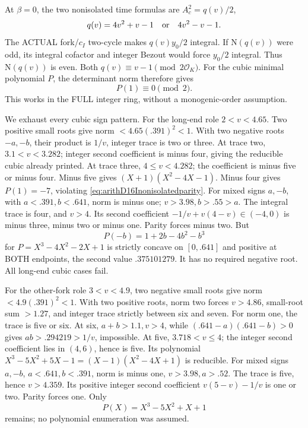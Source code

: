 \documentclass[11pt]{article}
\begin{document}
At \(\beta=0\), the two nonisolated
time formulas are \(A_c^2=q(v)/2\),
\[
                     q(v)=4v^2+v-1\quad\hbox{or}\quad4v^2-v-1 .
\]
The ACTUAL fork/\(c_I\) two-cycle
makes \(q(v)y_0/2\) integral.
If \(\mathrm N(q(v))\) were odd,
its integral cofactor and integer
Bezout would force \(y_0/2\) integral.
Thus \(\mathrm N(q(v))\) is even.
Both \(q(v)\equiv v-1\pmod{2\mathcal O_K}\).
For the cubic minimal polynomial \(P\),
the determinant norm therefore gives
\[
                                      P(1)\equiv0\pmod2 .
\tag{D16Iparity}\label{eq:arithD16Inonisolatedparity}
\]
This works in the FULL integer ring,
without a monogenic-order assumption.

We exhaust every cubic sign pattern.
For the long-end role \(2<v<4.65\).
Two positive small roots give norm
\(<4.65(.391)^2<1\).
With two negative roots \(-a,-b\),
their product is \(1/v\), integer trace
is two or three.
At trace two, \(3.1<v<3.282\);
integer second coefficient is minus four,
giving the reducible cubic already printed.
At trace three, \(4\le v<4.282\);
the coefficient is minus five or minus
four.
Minus five gives
\((X+1)(X^2-4X-1)\).
Minus four gives \(P(1)=-7\), violating
\eqref{eq:arithD16Inonisolatedparity}.
For mixed signs \(a,-b\), with
\(a<.391,b<.641\), norm is minus one;
\(v>3.98,b>.55>a\).
The integral trace is four, and
\(v>4\).
Its second coefficient
\(-1/v+v(4-v)\in(-4,0)\)
is minus three, minus two or minus one.
Parity forces minus two.
But
\[
 P(-b)=1+2b-4b^2-b^3
\]
for \(P=X^3-4X^2-2X+1\) is strictly
concave on \([0,.641]\) and positive
at BOTH endpoints, the second value
\(.375101279\).
It has no required negative root.
All long-end cubic cases fail.

For the other-fork role \(3<v<4.9\),
two negative small roots give norm
\(<4.9(.391)^2<1\).
With two positive roots, norm two
forces \(v>4.86\), small-root sum
\(>1.27\), and integer trace strictly
between six and seven.
For norm one, the trace is five or six.
At six, \(a+b>1.1,v>4\), while
\((.641-a)(.641-b)>0\) gives
\(ab>.294219>1/v\), impossible.
At five, \(3.718<v\le4\);
the integer second coefficient lies
in \((4,6)\), hence is five.
Its polynomial
\(X^3-5X^2+5X-1=(X-1)(X^2-4X+1)\)
is reducible.
For mixed signs \(a,-b\),
\(a<.641,b<.391\), norm is minus one,
\(v>3.98,a>.52\).
The trace is five, hence \(v>4.359\).
Its positive integer second coefficient
\(v(5-v)-1/v\) is one or two.
Parity forces one.
Only
\[
                                      P(X)=X^3-5X^2+X+1
\]
remains; no polynomial enumeration
was assumed.
\end{document}
